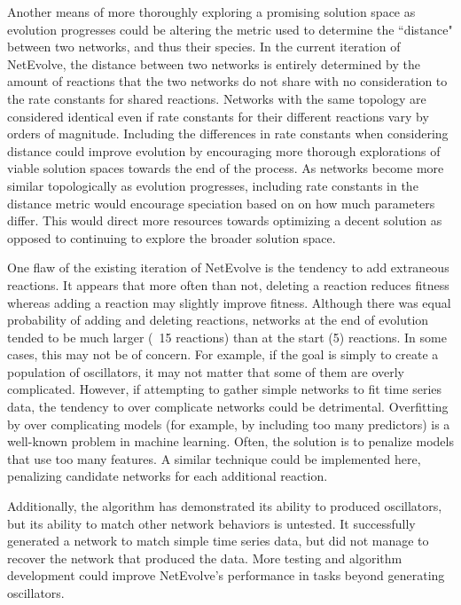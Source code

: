\documentclass[12pt]{report}
\begin{document}
Another means of more thoroughly exploring a promising solution space as evolution progresses could be altering the metric used to determine the ``distance" between two networks, and thus their species. In the current iteration of NetEvolve, the distance between two networks is entirely determined by the amount of reactions that the two networks do not share with no consideration to the rate constants for shared reactions. Networks with the same topology are considered identical even if rate constants for their different reactions vary by orders of magnitude. Including the differences in rate constants when considering distance could improve evolution by encouraging more thorough explorations of viable solution spaces towards the end of the process. As networks become more similar topologically as evolution progresses, including rate constants in the distance metric would encourage speciation based on on how much parameters differ. This would direct more resources towards optimizing a decent solution as opposed to continuing to explore the broader solution space.

One flaw of the existing iteration of NetEvolve is the tendency to add extraneous reactions. It appears that more often than not, deleting a reaction reduces fitness whereas adding a reaction may slightly improve fitness. Although there was equal probability of adding and deleting reactions, networks at the end of evolution tended to be much larger (~15 reactions) than at the start (5) reactions. In some cases, this may not be of concern. For example, if the goal is simply to create a population of oscillators, it may not matter that some of them are overly complicated. However, if attempting to gather simple networks to fit time series data, the tendency to over complicate networks could be detrimental. Overfitting by over complicating models (for example, by including too many predictors) is a well-known problem in machine learning. Often, the solution is to penalize models that use too many features. A similar technique could be implemented here, penalizing candidate networks for each additional reaction. 

Additionally, the algorithm has demonstrated its ability to produced oscillators, but its ability to match other network behaviors is untested. It successfully generated a network to match simple time series data, but did not manage to recover the network that produced the data. More testing and algorithm development could improve NetEvolve's performance in tasks beyond generating oscillators. 
\end{document}
